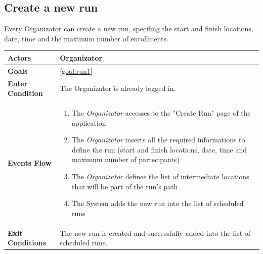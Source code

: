   \newpage
  \subsection{Create a new run}
Every Organizator can create a new run, specifing the start and finish locations, date, time and the maximum number of enrollments.

\begin{table}[H]
	\centering
    
    \begin{tabular}{|p{3.5cm}|p{10.3cm}|}
    
    \hline
    \textbf{\large{Actors}}  			& \tabitem Organizator 	\\
    				 					
    \hline
    \textbf{\large{Goals}} 				& \ref{goal:run1}\\
    
    \hline
    \textbf{\large{Enter Condition}}	& The Organizator is already logged in.		\\
    
    \hline
    \textbf{\large{Events Flow}}		& \begin{enumerate}[leftmargin=0.5cm]
                                          	\item The \emph{Organizator}  accesses to the "Create Run" page of the application
                                            \item The \emph{Organizator} inserts all the required informations to define the run (start and finish locations, date, time and maximum number of partecipants)
                                             \item The \emph{Organizator} defines the list of intermediate locations that will be part of the run's path
                                            \item The System adds the new run into the list of scheduled runs
                                           
                                          \end{enumerate}
    										\\
    \hline
    \textbf{\large{Exit Conditions}}    & The new run is created and successfully added into the list of scheduled runs.  \\
    

\end{tabular}
\end{table}
